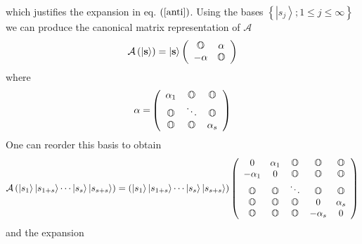 \documentclass[aps,preprint]{revtex4}%
\begin{document}
which justifies the expansion in eq. $\left(  \ref{anti}\right)  $. Using the
bases $\left\{  \left\vert s_{j}\right\rangle ;1\leq j\leq\infty\right\}  $ we
can produce the canonical matrix representation of $\mathcal{A}$
\begin{equation}
\mathcal{A}\left(  \left\vert \mathbf{s}\right\rangle \right)  =\left\vert
\mathbf{s}\right\rangle \left(
\begin{array}
[c]{cc}%
\mathbb{O} & \mathbf{\alpha}\\
-\mathbf{\alpha} & \mathbb{O}%
\end{array}
\right)
\end{equation}
where
\begin{equation}
\mathbf{\alpha=}\left(
\begin{array}
[c]{ccc}%
\alpha_{1} & \mathbb{O} & \mathbb{O}\\
\mathbb{O} & \ddots & \mathbb{O}\\
\mathbb{O} & \mathbb{O} & \alpha_{s}%
\end{array}
\right)
\end{equation}
One can reorder this basis to obtain
\begin{equation}
\mathcal{A}\left(  \left\vert s_{1}\right\rangle \left\vert s_{1+s}%
\right\rangle \cdots\left\vert s_{s}\right\rangle \left\vert s_{s+s}%
\right\rangle \right)  =\left(  \left\vert s_{1}\right\rangle \left\vert
s_{1+s}\right\rangle \cdots\left\vert s_{s}\right\rangle \left\vert
s_{s+s}\right\rangle \right)  \left(
\begin{array}
[c]{ccccc}%
0 & \alpha_{1} & \mathbb{O} & \mathbb{O} & \mathbb{O}\\
-\alpha_{1} & 0 & \mathbb{O} & \mathbb{O} & \mathbb{O}\\
\mathbb{O} & \mathbb{O} & \ddots & \mathbb{O} & \mathbb{O}\\
\mathbb{O} & \mathbb{O} & \mathbb{O} & 0 & \alpha_{s}\\
\mathbb{O} & \mathbb{O} & \mathbb{O} & -\alpha_{s} & 0
\end{array}
\right)
\end{equation}
and the expansion
\end{document}
